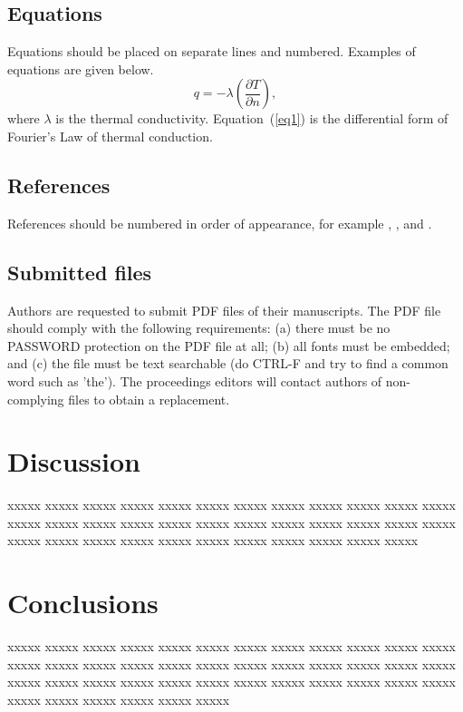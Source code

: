 \documentclass{article}
\begin{document}
\subsection{Equations}

Equations should be placed on separate lines and numbered. 
Examples of equations are given below.
\begin{equation}
q=-\lambda \left( \frac{\partial T}{\partial n} \right),
\label{eq1}
\end{equation}
where $\lambda$ is the thermal conductivity.
Equation~(\ref{eq1}) is the differential form of Fourier's Law of thermal conduction.

\subsection{References}

References should be numbered in order of appearance, for example \cite{Zhang10}, \cite{Patankar80}, and \cite{Kays90,Kawa09}. 

\subsection{Submitted files}
Authors are requested to submit PDF files of their manuscripts. 
The PDF file should comply with the following requirements: 
(a) there must be no PASSWORD protection on the PDF file at all; 
(b) all fonts must be embedded; 
and (c) the file must be text searchable (do CTRL-F and try to find a common word such as 'the'). 
The proceedings editors will contact authors of non-complying files to obtain a replacement.

\section{Discussion}

xxxxx xxxxx xxxxx xxxxx xxxxx xxxxx xxxxx
xxxxx xxxxx xxxxx xxxxx xxxxx xxxxx xxxxx
xxxxx xxxxx xxxxx xxxxx xxxxx xxxxx xxxxx
xxxxx xxxxx xxxxx xxxxx xxxxx xxxxx xxxxx
xxxxx xxxxx xxxxx xxxxx xxxxx xxxxx xxxxx

\section{Conclusions}

xxxxx xxxxx xxxxx xxxxx xxxxx xxxxx xxxxx
xxxxx xxxxx xxxxx xxxxx xxxxx xxxxx xxxxx
xxxxx xxxxx xxxxx xxxxx xxxxx xxxxx xxxxx
xxxxx xxxxx xxxxx xxxxx xxxxx xxxxx xxxxx
xxxxx xxxxx xxxxx xxxxx xxxxx xxxxx xxxxx
xxxxx xxxxx xxxxx xxxxx xxxxx xxxxx xxxxx
\end{document}
